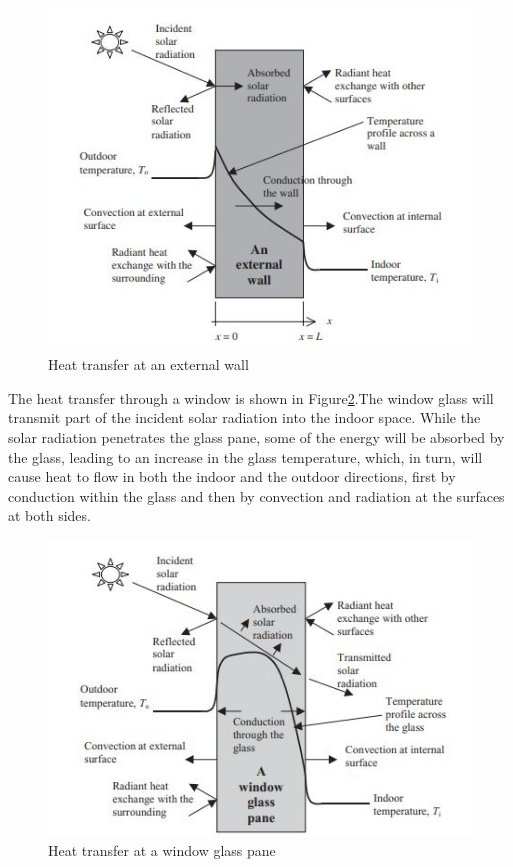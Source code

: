 \documentclass[a4paper,12pt]{report}
\numberwithin{equation}{section}
\begin{document}
\begin{figure}[H]
    \includegraphics[scale=1]{heat_transfer2.JPG}
    \centering
    \caption{Heat transfer at an external wall}
    \label{fig:heattransfer2}
\end{figure}

The heat transfer through a window is shown in Figure\ref{fig:heattransfer3}.The window glass will transmit part of the incident solar radiation into the indoor space. While the solar radiation penetrates the glass pane, some of the energy will be absorbed by the glass, leading to an increase in the glass temperature, which, in turn, will cause heat to flow in both the indoor and the outdoor directions, first by conduction within the glass and then by convection and radiation at the surfaces at both sides.

\begin{figure}[H]
    \includegraphics[scale=1]{heat_transfer3.JPG}
    \centering
    \caption{Heat transfer at a window glass pane}
    \label{fig:heattransfer3}
\end{figure}
\end{document}
